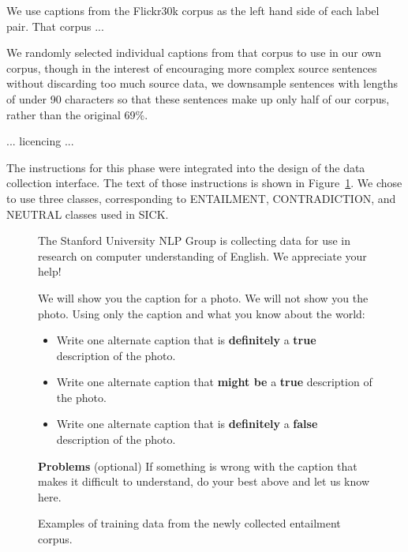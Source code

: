 We use captions from the Flickr30k corpus \cite{hodoshimage} as the left hand side of each label pair. That corpus ...

We randomly selected individual captions from that corpus to use in our own corpus, though in the interest of encouraging more complex source sentences without discarding too much source data, we downsample sentences with lengths of under 90 characters so that these sentences make up only half of our corpus, rather than the original 69\%.

... licencing ...

The instructions for this phase were integrated into the design of the data collection interface. The text of those instructions is shown in Figure~\ref{instructions-1}. We chose to use three classes, corresponding to ENTAILMENT, CONTRADICTION, and NEUTRAL classes used in SICK.

\begin{figure}
\footnotesize
The Stanford University NLP Group is collecting data for use in research on computer understanding of English. We appreciate your help!

We will show you the caption for a photo. We will not show you the photo. Using only the caption and what you know about the world:
\begin{itemize}
\item Write one alternate caption that is \textbf{definitely} a \textbf{true} description of the photo. 
\item Write one alternate caption that \textbf{might be} a \textbf{true} description of the photo. 
\item Write one alternate caption that is \textbf{definitely} a \textbf{false} description of the photo. 
\end{itemize}
\textbf{Problems} (optional)   If something is wrong with the caption that makes it difficult to understand, do your best above and let us know here.
\caption{\label{instructions-1}Examples of training data from the newly collected entailment corpus.}
\end{figure}


